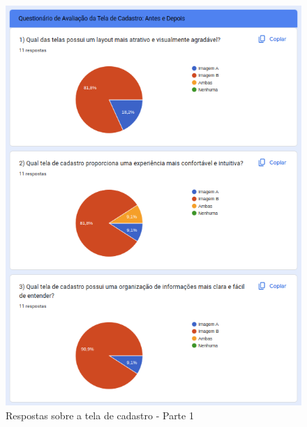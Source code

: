 \begin{figure}[!h]
	\begin{center}
	    \includegraphics[scale=0.7]{figs/Answers/Professionals/08.png}
	\end{center}
	\caption{\label{APC_TC01}Respostas sobre a tela de cadastro - Parte 1}
\end{figure}

\newpage

